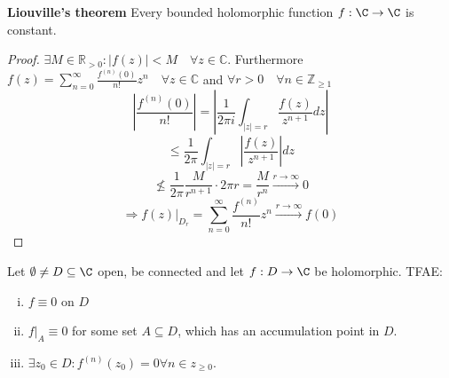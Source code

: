 \begin{theorem}
  \textbf{Liouville's theorem}
  \newline Every bounded holomorphic function $f:\C \to \C$ is constant.
\end{theorem}
\begin{proof}
  $\exists M \in \mathbb{R}_{> 0}:|f(z)|<M \quad \forall z \in \mathbb{C}$. Furthermore $f(z)=\sum_{n=0}^{\infty} \frac{f^{(n)}(0)}{n !} z^{n} \quad \forall z \in \mathbb{C}$ and $\forall r>0 \quad \forall n \in \mathbb{Z}_{\geq 1}$
  $$\left|\frac{f^{(n)}(0)}{n!}\right|=\left|\frac{1}{2\pi i} \int_{|z|=r}\frac{f(z)}{z^{n+1}}dz\right|$$
  $$\leq \frac{1}{2 \pi} \int_{|z|=r} \left| \frac{f(z)}{z^{n+1}} \right| d z$$
  $$\nleq \frac{1}{2\pi} \frac{M}{r^{n+1}} \cdot 2 \pi r = \frac{M}{r^n}\xrightarrow{r\to \infty}0$$
  $$\Rightarrow f(z)\rvert_{D_r}=\sum_{n=0}^{\infty} \frac{f^{(n)}}{n!} z^n \xrightarrow{r\to \infty}f(0)$$
  \qedhere
\end{proof}
\begin{lemma}
  Let $\emptyset \neq D \subseteq \C$ open, be connected and let $f:D\to \C$ be holomorphic. TFAE:
    \begin{enumerate}[(i)]
      \item $f \equiv 0$ on $D$
      \item $f \rvert_A \equiv 0$ for some set $A\subseteq D$, which has an accumulation point in $D$.
      \item $\exists z_0 \in D: f^{(n)}(z_0)=0 \forall n \in z_{\geq0}$.
    \end{enumerate}
\end{lemma}

